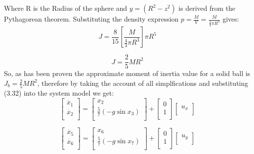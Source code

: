  Where R is the Radius of the sphere and $y = (R^2-z^2)$ is derived from the Pythagorean theorem.
 Substituting the density expression $p = \frac{M}{V} = \frac{M}{\frac{4}{3}\pi R^3}$ gives:
\begin{equation}
J = \frac{8}{15}\left[  \frac{M}{\frac{4}{3}\pi R^3} \right]\pi R^5 
\end{equation}

 \begin{equation}
J = \frac{2}{5}MR^2 
\end{equation}
 So, as has been proven the approximate moment of inertia value for a solid ball is $J_b = \frac{2}{5}MR^2$, therefore by taking the account of all simplfications and substituting (3.32) into the system model we get:
\begin{equation}
\begin{bmatrix}
\dot{x_1}\\
\dot{x_2}\\
\end{bmatrix}
=
\begin{bmatrix}
x_2\\
\frac{5}{7}(-g\sin{x_3})\\
\end{bmatrix}
+ 
\begin{bmatrix}
0 \\
1 \\
\end{bmatrix}
\begin{bmatrix}
u_x  \\
\end{bmatrix}
\end{equation}

\begin{equation}
\begin{bmatrix}
\dot{x_5}\\
\dot{x_6}\\
\end{bmatrix}
=
\begin{bmatrix}
x_6\\
\frac{5}{7}(-g\sin{x_7})\\
\end{bmatrix}
+ 
\begin{bmatrix}
0  \\
1  \\
\end{bmatrix}
\begin{bmatrix}
u_y  \\
\end{bmatrix}
\end{equation}

